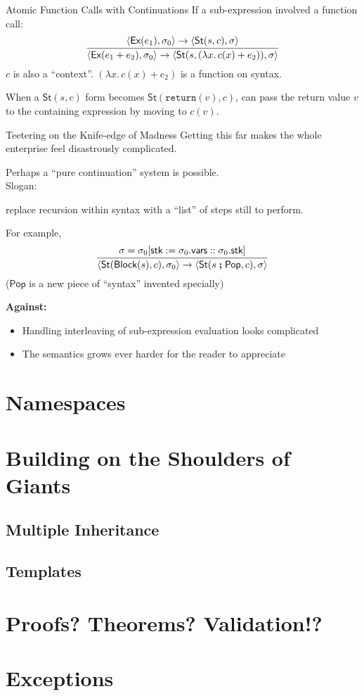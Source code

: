 \documentclass[compress,dvips,color=usenames,xcolor=dvipsnames]{beamer}
\newcommand{\structcol}{\usebeamercolor[fg]{structure}}
\begin{document}
\begin{frame}{Atomic Function Calls with Continuations}
If a sub-expression involved a function call:
\[
\infer{
  \langle \textsf{Ex}(e_1 + e_2), \sigma_0 \rangle
  \rightarrow
  \langle \textsf{St}(s, (\lambda x.\, c(x) + e_2)), \sigma\rangle
}{
  \langle \textsf{Ex}(e_1), \sigma_0 \rangle
  \rightarrow
  \langle \textsf{St}(s, c), \sigma \rangle
}
\]
$c$ is also a ``context''.  $(\lambda x.\,c(x) + e_2)$ is a function
on syntax.

\bigskip
When a $\textsf{St}(s,c)$ form becomes
$\textsf{St}(\texttt{return}(v),c)$, can pass the return value $v$ to
the containing expression by moving to $c(v)$.

\end{frame}

\begin{frame}{Teetering on the Knife-edge of Madness}
Getting this far makes the whole enterprise feel disastrously
complicated.

\bigskip
Perhaps a ``pure continuation'' system is possible.\\
{\structcol Slogan:}
\parbox[t]{0.8\textwidth}{replace recursion within syntax with
  a ``list'' of steps still to perform.}

\bigskip
For example,
\[
\infer{
  \langle \textsf{St}(\textsf{Block}(s), c), \sigma_0\rangle
  \rightarrow
  \langle \textsf{St}(s \;\textbf{;}\;\textsf{Pop}, c), \sigma\rangle
}{
  \sigma = \sigma_0[\textsf{stk} :=
       \sigma_0.\textsf{vars} :: \sigma_0.\textsf{stk}]
}
\]
($\textsf{Pop}$ is a new piece of ``syntax'' invented
specially)

\bigskip
\textbf{\structcol Against:}
\begin{itemize}
\item Handling interleaving of sub-expression evaluation looks
  complicated
\item The semantics grows ever harder for the reader to appreciate
\end{itemize}

\end{frame}

\section{Namespaces}

\section{Building on the Shoulders of Giants}
\subsection{Multiple Inheritance}
\subsection{Templates}

\section{Proofs? Theorems?  Validation!?}


\section{Exceptions}
\end{document}
